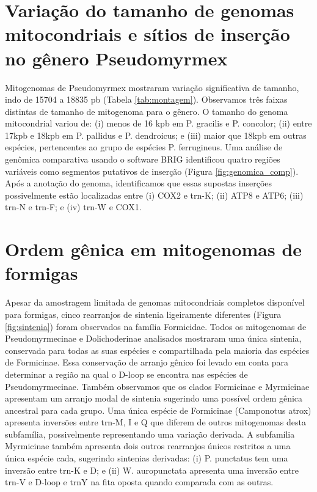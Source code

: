 \documentclass[../DISSERTACAO_MAIN.tex]{subfiles}
\begin{document}
\restoregeometry
	
	
	\section{Variação do tamanho de genomas mitocondriais e sítios de inserção no gênero Pseudomyrmex}
	Mitogenomas de Pseudomyrmex mostraram variação significativa de tamanho, indo de 15704 a 18835 pb (Tabela \ref{tab:montagem}). Observamos três faixas distintas de tamanho de mitogenoma para o gênero. O tamanho do genoma mitocondrial variou de: (i) menos de 16 kpb em P. gracilis e P. concolor; (ii) entre 17kpb e 18kpb em P. pallidus e P. dendroicus; e (iii) maior que 18kpb em outras espécies, pertencentes ao grupo de espécies P. ferrugineus. Uma análise de genômica comparativa usando o software BRIG identificou quatro regiões variáveis como segmentos putativos de inserção (Figura \ref{fig:genomica_comp}). Após a anotação do genoma, identificamos que essas supostas inserções possivelmente estão localizadas entre (i) COX2 e trn-K; (ii) ATP8 e ATP6; (iii) trn-N e trn-F; e (iv) trn-W e COX1.
	
	\section{Ordem gênica em mitogenomas de formigas}
	Apesar da amostragem limitada de genomas mitocondriais completos disponível para formigas, cinco rearranjos de sintenia ligeiramente diferentes (Figura \ref{fig:sintenia}) foram observados na família Formicidae. Todos os mitogenomas de Pseudomyrmecinae e Dolichoderinae analisados mostraram uma única sintenia, conservada para todas as suas espécies e compartilhada pela maioria das espécies de Formicinae. Essa conservação de arranjo gênico foi levado em conta para determinar a região na qual o  D-loop se encontra nas espécies de Pseudomyrmecinae. Também observamos que os clados Formicinae e Myrmicinae apresentam um arranjo modal de sintenia sugerindo uma possível ordem gênica ancestral para cada grupo. Uma única espécie de Formicinae (Camponotus atrox) apresenta inversões entre trn-M, I e Q que diferem de outros mitogenomas desta subfamília, possivelmente representando uma variação derivada. A subfamília Myrmicinae também apresenta dois outros rearranjos únicos restritos a uma única espécie cada, sugerindo sintenias derivadas: (i) P. punctatus tem uma inversão entre trn-K e D; e (ii) W. auropunctata apresenta uma inversão entre trn-V e D-loop e trnY na fita oposta quando comparada com as outras. 
	
\end{document}
